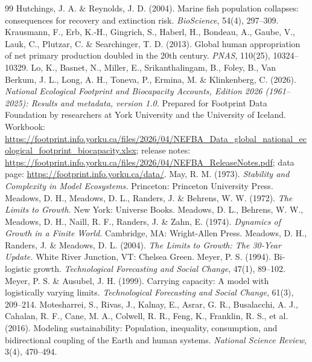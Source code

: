 \documentclass[preprint,12pt,authoryear]{elsarticle}
\begin{document}
\begin{thebibliography}{99}
 Hutchings, J. A. \& Reynolds, J. D. (2004). Marine fish population collapses: consequences for recovery and extinction risk. \emph{BioScience}, 54(4), 297--309.
 Krausmann, F., Erb, K.-H., Gingrich, S., Haberl, H., Bondeau, A., Gaube, V., Lauk, C., Plutzar, C. \& Searchinger, T. D. (2013). Global human appropriation of net primary production doubled in the 20th century. \emph{PNAS}, 110(25), 10324--10329.
 Lo, K., Basnet, N., Miller, E., Srikanthalingam, B., Foley, B., Van Berkum, J. L., Long, A. H., Toneva, P., Ermina, M. \& Klinkenberg, C. (2026). \emph{National Ecological Footprint and Biocapacity Accounts, Edition 2026 (1961--2025): Results and metadata, version 1.0.} Prepared for Footprint Data Foundation by researchers at York University and the University of Iceland. Workbook: \url{https://footprint.info.yorku.ca/files/2026/04/NEFBA_Data_global_national_ecological_footprint_biocapacity.xlsx}; release notes: \url{https://footprint.info.yorku.ca/files/2026/04/NEFBA_ReleaseNotes.pdf}; data page: \url{https://footprint.info.yorku.ca/data/}.
 May, R. M. (1973). \emph{Stability and Complexity in Model Ecosystems.} Princeton: Princeton University Press.
 Meadows, D. H., Meadows, D. L., Randers, J. \& Behrens, W. W. (1972). \emph{The Limits to Growth.} New York: Universe Books.
 Meadows, D. L., Behrens, W. W., Meadows, D. H., Naill, R. F., Randers, J. \& Zahn, E. (1974). \emph{Dynamics of Growth in a Finite World.} Cambridge, MA: Wright-Allen Press.
 Meadows, D. H., Randers, J. \& Meadows, D. L. (2004). \emph{The Limits to Growth: The 30-Year Update.} White River Junction, VT: Chelsea Green.
 Meyer, P. S. (1994). Bi-logistic growth. \emph{Technological Forecasting and Social Change}, 47(1), 89--102.
 Meyer, P. S. \& Ausubel, J. H. (1999). Carrying capacity: A model with logistically varying limits. \emph{Technological Forecasting and Social Change}, 61(3), 209--214.
 Motesharrei, S., Rivas, J., Kalnay, E., Asrar, G. R., Busalacchi, A. J., Cahalan, R. F., Cane, M. A., Colwell, R. R., Feng, K., Franklin, R. S., et al. (2016). Modeling sustainability: Population, inequality, consumption, and bidirectional coupling of the Earth and human systems. \emph{National Science Review}, 3(4), 470--494.

\end{thebibliography}
\end{document}
